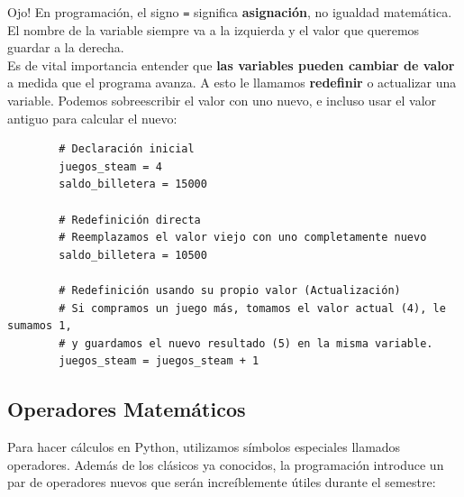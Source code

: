 \documentclass[11pt, a4paper]{article}
\begin{document}
	Ojo! En programación, el signo \texttt{=} significa \textbf{asignación}, no igualdad matemática. El nombre de la variable siempre va a la izquierda y el valor que queremos guardar a la derecha.\\
	
	Es de vital importancia entender que \textbf{las variables pueden cambiar de valor} a medida que el programa avanza. A esto le llamamos \textbf{redefinir} o actualizar una variable. Podemos sobreescribir el valor con uno nuevo, e incluso usar el valor antiguo para calcular el nuevo:
	
	\begin{lstlisting}
		# Declaración inicial
		juegos_steam = 4
		saldo_billetera = 15000
		
		# Redefinición directa
		# Reemplazamos el valor viejo con uno completamente nuevo
		saldo_billetera = 10500  
		
		# Redefinición usando su propio valor (Actualización)
		# Si compramos un juego más, tomamos el valor actual (4), le sumamos 1, 
		# y guardamos el nuevo resultado (5) en la misma variable.
		juegos_steam = juegos_steam + 1
	\end{lstlisting}
	
	\subsection{Operadores Matemáticos}
	Para hacer cálculos en Python, utilizamos símbolos especiales llamados operadores. Además de los clásicos ya conocidos, la programación introduce un par de operadores nuevos que serán increíblemente útiles durante el semestre:
	
\end{document}
